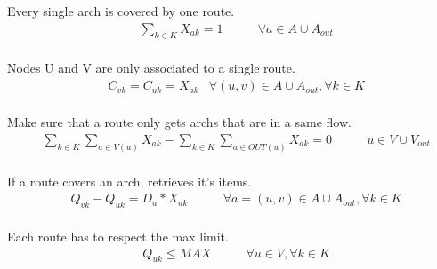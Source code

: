 Every single arch is covered by one route. \\

\begin{align*}
    &\sum_{k \in K}{X_{ak}=1} & \qquad \forall a \in {A \cup A_{out}} \\
\end{align*}

Nodes U and V are only associated to a single route. \\

\begin{align*}
    &C_{vk} = C_{uk} = X_{ak} & \forall (u,v) \in {A \cup A_{out}}, \forall k \in K \\
\end{align*}

Make sure that a route only gets archs that are in a same flow. \\

\begin{align*}
    &\sum_{k \in K} \sum_{a \in V(u)} X_{ak} - \sum_{k \in K} \sum_{a \in OUT(u)} X_{ak} = 0 & \qquad u \in {V \cup V_{out}} \\
\end{align*}

If a route covers an arch, retrieves it's items. \\

\begin{align*}
    &Q_{vk} - Q_{uk} = D_a * X_{ak} & \qquad \forall a=(u,v) \in {A \cup A_{out}}, \forall k \in K \\
\end{align*}

Each route has to respect the max limit. \\

\begin{align*}
    &Q_{uk} \leq MAX & \qquad \forall u \in V, \forall k \in K \\
\end{align*}